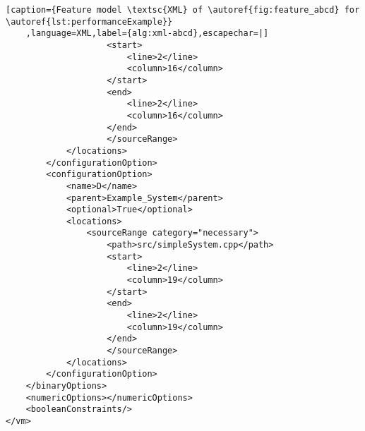 \begin{lstlisting}[caption={Feature model \textsc{XML} of \autoref{fig:feature_abcd} for \autoref{lst:performanceExample}}
    ,language=XML,label={alg:xml-abcd},escapechar=|]
                    <start>                               
                        <line>2</line>
                        <column>16</column>
                    </start>
                    <end>                                
                        <line>2</line>
                        <column>16</column>
                    </end>
                    </sourceRange>
            </locations>
        </configurationOption>
        <configurationOption>                     
            <name>D</name>                   
            <parent>Example_System</parent>
            <optional>True</optional>
            <locations>                              
                <sourceRange category="necessary">    
                    <path>src/simpleSystem.cpp</path>      
                    <start>                               
                        <line>2</line>
                        <column>19</column>
                    </start>
                    <end>                                
                        <line>2</line>
                        <column>19</column>
                    </end>
                    </sourceRange>
            </locations>
        </configurationOption>
    </binaryOptions>
    <numericOptions></numericOptions>             
    <booleanConstraints/>
</vm>
\end{lstlisting}

\pagebreak

